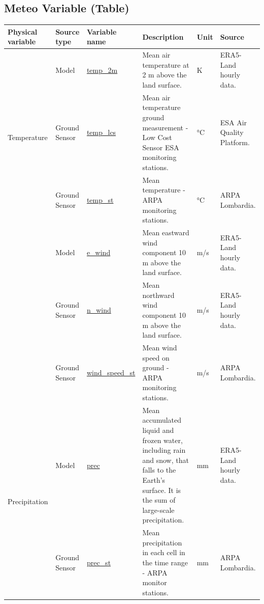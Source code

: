 \subsection{Meteo Variable (Table)}
\begin{center}
\setlength{\arrayrulewidth}{1.5pt}

\begin{longtable}{ |p{2cm}|p{1.5cm}|p{2.3cm}|p{4cm}|p{1cm}|p{2cm}| } 
\hline
\textbf{Physical variable} & \textbf{Source type}  & \textbf{Variable name}  & \textbf{Description}  & \textbf{Unit}  & \textbf{Source}\\ 
\hline
\multirow{3}{4em}{Temperature} & Model  & \underline{temp\_2m} & Mean air temperature at 2 m above the land surface.\par & K & ERA5-Land hourly data.\\ 
& Ground \newline Sensor  & \underline{temp\_lcs} &  Mean air temperature ground measurement - Low Cost Sensor ESA monitoring stations.\par & °C & ESA Air Quality Platform.\\ 
& Ground \newline Sensor  & \underline{temp\_st} &  Mean temperature - ARPA monitoring stations.\par & °C & ARPA \newline Lombardia.\\ \hline
\pagebreak
\hline
\multirow{4}{4em}{Wind} & Model  & \underline{e\_wind} & Mean eastward wind component 10 m above the land surface.\par & m/s & ERA5-Land hourly data.\\ 
& Ground \newline Sensor  & \underline{n\_wind} &  Mean northward wind component 10 m above the land surface.\par & m/s & ERA5-Land hourly data.\\
& Ground \newline Sensor  & \underline{wind\_speed\_st} &  Mean wind speed on ground  - ARPA monitoring stations. \par& m/s& ARPA \newline Lombardia.\\ \hline

\multirow{2}{4em}{Precipitation} & Model  & \underline{prec} & Mean accumulated liquid and frozen water, including rain and snow, that falls to the Earth's surface. It is the sum of large-scale precipitation. \par & mm & ERA5-Land hourly data.\\ 
& Ground \newline Sensor  & \underline{prec\_st} &  Mean precipitation in each cell in the time range - ARPA monitor stations. \par & mm & ARPA \newline Lombardia.\\ \hline


\end{longtable}
\end{center}
